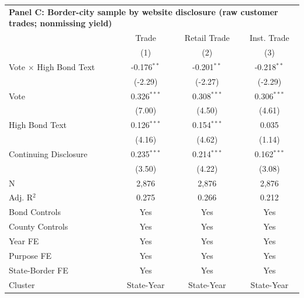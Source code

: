 \begingroup
\centering
\begin{tabular*}{\textwidth}{@{\extracolsep{\fill}}lccc}
\multicolumn{5}{l}{\textbf{Panel C: Border-city sample by website disclosure (raw customer trades; nonmissing yield)}}\\

\addlinespace
   \toprule
                                 & Trade         & Retail Trade  & Inst. Trade\\  
                                 & (1)           & (2)           & (3)\\  
   \midrule 
   Vote $\times$ High Bond Text  & -0.176$^{**}$ & -0.201$^{**}$ & -0.218$^{**}$\\   
                                 & (-2.29)      & (-2.27)      & (-2.29)\\   
   Vote                          & 0.326$^{***}$ & 0.308$^{***}$ & 0.306$^{***}$\\   
                                 & (7.00)       & (4.50)       & (4.61)\\   
   High Bond Text                & 0.126$^{***}$ & 0.154$^{***}$ & 0.035\\   
                                 & (4.16)       & (4.62)       & (1.14)\\   
   Continuing Disclosure         & 0.235$^{***}$ & 0.214$^{***}$ & 0.162$^{***}$\\   
                                 & (3.50)       & (4.22)       & (3.08)\\   
   \hline
   N                  & 2,876         & 2,876         & 2,876\\  
   Adj. R$^2$                & 0.275         & 0.266         & 0.212\\  
   Bond Controls                 & Yes           & Yes           & Yes\\  
   County Controls               & Yes           & Yes           & Yes\\  
   Year FE                       & Yes           & Yes           & Yes\\  
   Purpose FE                    & Yes           & Yes           & Yes\\  
   State-Border FE               & Yes           & Yes           & Yes\\  
   Cluster              & State-Year & State-Year & State-Year\\  
   \bottomrule
\end{tabular*}
\par\endgroup
